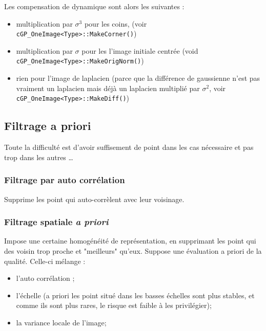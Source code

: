 Les compensation de dynamique sont alors les suivantes :

\begin{itemize}
   \item multiplication par $\sigma^3$ pour les coins, (voir {\tt cGP\_OneImage<Type>::MakeCorner()})

   \item multiplication par $\sigma$ pour les l'image initiale centr\'ee (void {\tt cGP\_OneImage<Type>::MakeOrigNorm()})

   \item rien pour l'image de laplacien (parce que la diff\'erence de gaussienne n'est pas vraiment un laplacien
         mais d\'ej\`a un laplacien multipli\'e par $\sigma^2$, voir {\tt cGP\_OneImage<Type>::MakeDiff()})

\end{itemize}
 

\subsection{Filtrage a priori}

Toute la difficult\'e est d'avoir suffisement de point dans les cas n\'ecessaire et pas trop
dans les autres \dots


\subsubsection{Filtrage par auto corr\'elation}

Supprime les point qui auto-corr\`elent avec leur voisinage.

\subsubsection{Filtrage spatiale \emph{a priori}}

Impose une certaine homog\'en\'eit\'e de repr\'esentation, en supprimant les point 
qui des voisin trop proche et "meilleurs" qu'eux. Suppose une \'evaluation a priori
de la qualit\'e. Celle-ci m\'elange : 

\begin{itemize}
   \item l'auto corr\'elation ;
   \item l'\'echelle (a priori les point situ\'e dans les basses \'echelles sont plus stables,
         et comme ils sont plus rares, le risque est faible \`a les privil\'egier);
   \item  la variance locale de l'image;
\end{itemize}
 

